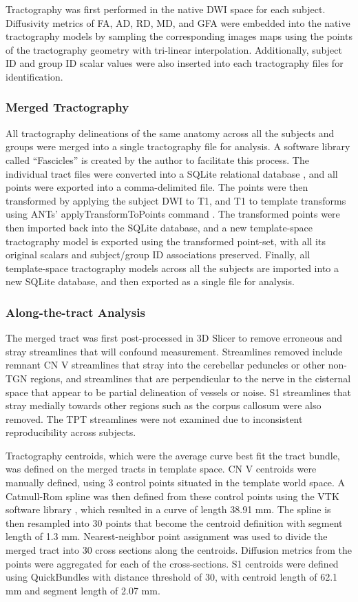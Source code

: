 Tractography was first performed in the native DWI space for each subject. Diffusivity metrics of FA, AD, RD, MD, and GFA  were embedded into the native tractography models by sampling the corresponding images maps using the points of the tractography geometry with tri-linear interpolation. Additionally, subject ID and group ID scalar values were also inserted into each tractography files for identification. 

\subsubsection{Merged Tractography}
All tractography delineations of the same anatomy across all the subjects and groups were merged into a single tractography file for analysis. A software library called “Fascicles” is created by the author to facilitate this process. The individual tract files were converted into a SQLite relational database \cite{owens2010sqlite}, and  all points were exported into a comma-delimited file. The points were then transformed by applying the subject DWI to T1, and T1 to template transforms using ANTs’  applyTransformToPoints command \cite{Avants2009}. The transformed points were then imported back into the SQLite database, and a new template-space tractography model is exported using the transformed point-set, with all its original scalars and subject/group ID associations preserved. Finally, all template-space tractography models across all the subjects are imported into a new SQLite database, and then exported as a single file for analysis. 

\subsubsection{Along-the-tract Analysis}
The merged tract was first post-processed in 3D Slicer to remove erroneous and stray streamlines that will confound measurement. Streamlines removed include remnant CN V streamlines that stray into the cerebellar peduncles or other non-TGN regions, and streamlines that are perpendicular to the nerve in the cisternal space that appear to be partial delineation of vessels or noise. S1 streamlines that stray medially towards other regions such as the corpus callosum were also removed. The TPT streamlines were not examined due to inconsistent reproducibility across subjects. 

Tractography centroids, which were the average curve best fit the tract bundle, was defined on the merged tracts in template space. CN V centroids were manually defined, using 3 control points situated in the template world space. A Catmull-Rom spline \cite{DeRose1988} was then defined from these control points using the VTK software library \cite{Schroeder2005}, which resulted in a curve of length 38.91 mm. The spline is then resampled into 30 points that become the centroid definition with segment length of 1.3 mm. Nearest-neighbor point assignment was used to divide the merged tract into 30 cross sections along the centroids. Diffusion metrics from the points were aggregated for each of the cross-sections.  S1 centroids were defined using QuickBundles \cite{Garyfallidis2012} with distance threshold of 30, with centroid length of 62.1 mm and segment length of 2.07 mm. 

